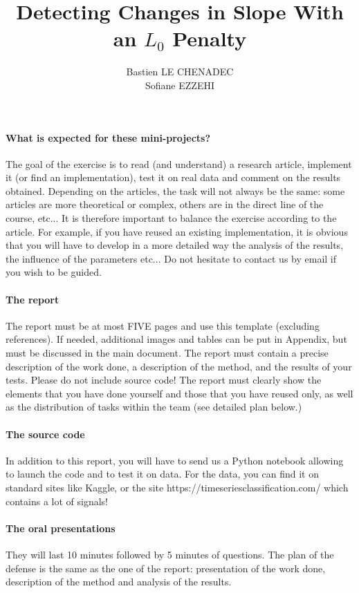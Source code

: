 \documentclass[11pt]{article}
\title{Detecting Changes in Slope With an $L_0$ Penalty}
\author{
Bastien LE CHENADEC \email{bastien.le-chenadec@eleves.enpc.fr} \\ %
Sofiane EZZEHI \email{sofiane.ezzehi@eleves.enpc.fr} %
}
\begin{document}
\maketitle

\paragraph{What is expected for these mini-projects?}
The goal of the exercise is to read (and understand) a research article, implement it (or find an implementation), test it on real data and comment on the results obtained.
Depending on the articles, the task will not always be the same: some articles are more theoretical or complex, others are in the direct line of the course, etc... It is therefore important to balance the exercise according to the article. For example, if you have reused an existing implementation, it is obvious that you will have to develop in a more detailed way the analysis of the results, the influence of the parameters etc... Do not hesitate to contact us by email if you wish to be guided.

\paragraph{The report}
The report must be at most FIVE pages and use this template (excluding references). If needed, additional images and tables can be put in Appendix, but must be discussed in the main document. The report must contain a precise description of the work done, a description of the method, and the results of your tests. Please do not include source code! The report must clearly show the elements that you have done yourself and those that you have reused only, as well as the distribution of tasks within the team (see detailed plan below.)

\paragraph{The source code}
In addition to this report, you will have to send us a Python notebook allowing to launch the code and to test it on data. For the data, you can find it on standard sites like Kaggle, or the site https://timeseriesclassification.com/ which contains a lot of signals!


\paragraph{The oral presentations}
They will last 10 minutes followed by 5 minutes of questions. The plan of the defense is the same as the one of the report: presentation of the work done, description of the method and analysis of the results.
\end{document}
